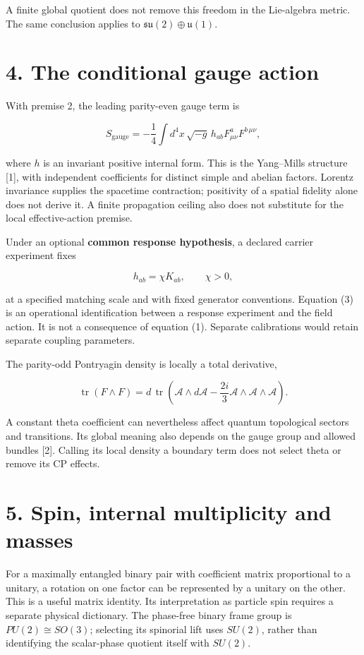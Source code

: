\documentclass[
  11pt,
  a4paper,
]{article}
\begin{document}
A finite global quotient does not remove this freedom in the Lie-algebra metric. The same conclusion applies to \(\mathfrak{su}(2)\oplus\mathfrak u(1)\).

\section{4. The conditional gauge action}\label{the-conditional-gauge-action}

With premise 2, the leading parity-even gauge term is

\[
 S_{\mathrm{gauge}}=-\frac14\int d^4x\,\sqrt{-g}\,
 h_{ab}F^a_{\mu\nu}F^{b\,\mu\nu}, \tag{2}
\]

where \(h\) is an invariant positive internal form. This is the Yang--Mills structure {[}1{]}, with independent coefficients for distinct simple and abelian factors. Lorentz invariance supplies the spacetime contraction; positivity of a spatial fidelity alone does not derive it. A finite propagation ceiling also does not substitute for the local effective-action premise.

Under an optional \textbf{common response hypothesis}, a declared carrier experiment fixes

\[
 h_{ab}=\chi K_{ab},\qquad\chi>0, \tag{3}
\]

at a specified matching scale and with fixed generator conventions. Equation (3) is an operational identification between a response experiment and the field action. It is not a consequence of equation (1). Separate calibrations would retain separate coupling parameters.

The parity-odd Pontryagin density is locally a total derivative,

\[
 \operatorname{tr}(F\wedge F)
 =d\,\operatorname{tr}\!\left(\mathcal A\wedge d\mathcal A
       -\frac{2i}{3}\mathcal A\wedge\mathcal A\wedge\mathcal A\right).
\]

A constant theta coefficient can nevertheless affect quantum topological sectors and transitions. Its global meaning also depends on the gauge group and allowed bundles {[}2{]}. Calling its local density a boundary term does not select theta or remove its CP effects.

\section{5. Spin, internal multiplicity and masses}\label{spin-internal-multiplicity-and-masses}

For a maximally entangled binary pair with coefficient matrix proportional to a unitary, a rotation on one factor can be represented by a unitary on the other. This is a useful matrix identity. Its interpretation as particle spin requires a separate physical dictionary. The phase-free binary frame group is \(PU(2)\cong SO(3)\); selecting its spinorial lift uses \(SU(2)\), rather than identifying the scalar-phase quotient itself with \(SU(2)\).
\end{document}
